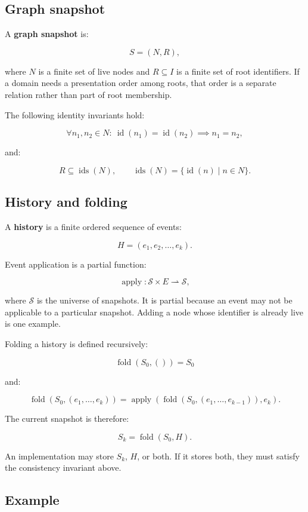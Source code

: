 \documentclass[11pt]{article}
\begin{document}
\subsection{Graph snapshot}

A \textbf{graph snapshot} is:

\[
S=(N,R),
\]

where $N$ is a finite set of live nodes and $R\subseteq I$ is a finite set of
root identifiers. If a domain needs a presentation order among roots, that
order is a separate relation rather than part of root membership.

The following identity invariants hold:

\[
\forall n_1,n_2\in N:\
\operatorname{id}(n_1)=\operatorname{id}(n_2)\implies n_1=n_2,
\]

and:

\[
R\subseteq\operatorname{ids}(N),
\qquad
\operatorname{ids}(N)=\{\operatorname{id}(n)\mid n\in N\}.
\]

\subsection{History and folding}

A \textbf{history} is a finite ordered sequence of events:

\[
H=(e_1,e_2,\ldots,e_k).
\]

Event application is a partial function:

\[
\operatorname{apply}:\mathcal{S}\times E\rightharpoonup\mathcal{S},
\]

where $\mathcal{S}$ is the universe of snapshots. It is partial because an
event may not be applicable to a particular snapshot. Adding a node whose
identifier is already live is one example.

Folding a history is defined recursively:

\[
\operatorname{fold}(S_0,())=S_0
\]

and:

\[
\operatorname{fold}(S_0,(e_1,\ldots,e_k))
=
\operatorname{apply}
\left(
  \operatorname{fold}(S_0,(e_1,\ldots,e_{k-1})),e_k
\right).
\]

The current snapshot is therefore:

\[
S_k=\operatorname{fold}(S_0,H).
\]

An implementation may store $S_k$, $H$, or both. If it stores both, they must
satisfy the consistency invariant above.

\subsection{Example}
\end{document}
